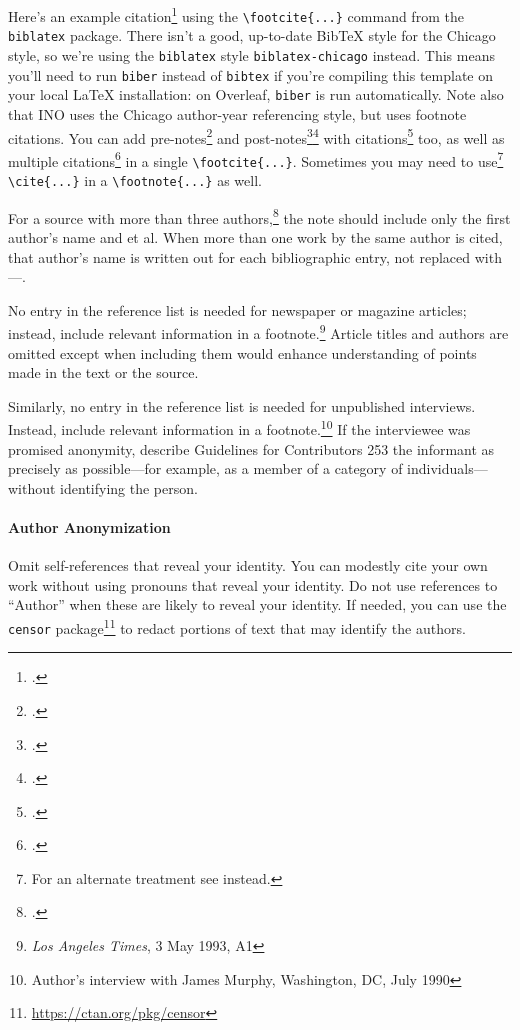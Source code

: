 \documentclass{cup-ino}
\begin{document}
\noindent Here's an example citation\footcite{ries:sweeney} using the \verb|\footcite{...}| command from the \texttt{biblatex} package. There isn't a good, up-to-date BibTeX style for the Chicago style, so we're using the \texttt{biblatex} style \texttt{biblatex-chicago} instead. This means you'll need to run \texttt{biber} instead of \texttt{bibtex} if you're compiling this template on your local \LaTeX{} installation: on Overleaf, \texttt{biber} is run automatically. Note also that INO uses the Chicago author-year referencing style, but uses footnote citations. You can add pre-notes\footcite[See also][]{risse:2000} and post-notes\footcite[52]{checkel:1997}\footcite[119]{grieco:1993} with citations\footcite{simmons:2001} too, as well as multiple citations\footcite{elliot:1994,kilroy:1995,pauwelyn:2015,mastanduno:1996} in a single \verb|\footcite{...}|. Sometimes you may need to use\footnote{For an alternate treatment see \cite{ussenate:chemwarfare:1984} instead.} \verb|\cite{...}| in a \verb|\footnote{...}| as well. 

For a source with more than three authors,\footcite{inman:etal:2013} the note should include only the first author's name and et al. When more than one work by the same author is cited, that author's name is written out for each bibliographic entry, not replaced with ---.

No entry in the reference list is needed for newspaper or magazine articles; instead, include relevant information in a footnote.\footnote{\emph{Los Angeles Times}, 3 May 1993, A1} Article titles and authors are omitted except when including them would enhance understanding of points made in the text or the source.

Similarly, no entry in the reference list is needed for unpublished interviews. Instead, include relevant information in a footnote.\footnote{Author's interview with James Murphy, Washington, DC, July 1990} If the interviewee was promised anonymity, describe Guidelines for Contributors 253 the informant as precisely as possible---for example, as a member of a category of individuals---without identifying the person.

\paragraph{Author Anonymization}
Omit self-references that reveal your identity. You can modestly cite your own work without using pronouns that reveal your identity. Do not use references to ``Author'' when these are likely to reveal your identity. If needed, you can use the \texttt{censor} package\footnote{\url{https://ctan.org/pkg/censor}} to redact portions of text that may identify the authors.
\end{document}
